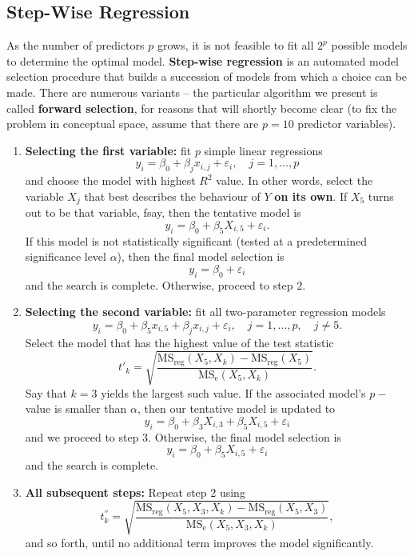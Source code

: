 \subsection{Step-Wise Regression}
As the number of predictors $p$ grows, it is not feasible to fit all $2^{p}$ possible models to determine the optimal model. \newl \textbf{Step-wise regression} is an automated model selection procedure that builds a succession of models from which a choice can be made. There are numerous variants -- the particular algorithm we present is called \textbf{forward selection}, for reasons that will shortly become clear (to fix the problem in conceptual space, assume that there are $p=10$ predictor variables).
\begin{enumerate}
    \item \textbf{Selecting the first variable:} fit $p$ simple linear regressions $$y_i=\beta_0 + \beta_jx_{i,j}+\varepsilon_i,\quad j=1,\ldots, p$$ and choose the model with highest $R^{2}$ value. In other words, select the variable $X_j$ that best describes the behaviour of $Y$ \textbf{on its own}. If $X_{5}$ turns out to be that variable, fsay, then the tentative model is $$y_{i}=\beta_{0}+\beta_{5}X_{i,5}+\varepsilon_{i}.$$ If this model is not statistically significant (tested at a predetermined significance level $\alpha$), then the final model selection is $$y_{i}=\beta_{0}+\varepsilon_{i}$$ and the search is complete. Otherwise, proceed to step 2.
    \item \textbf{Selecting the second variable:} fit all two-parameter regression models $$y_i=\beta_0 + \beta_5x_{i,5}+ \beta_jx_{i,j}+\varepsilon_i,\quad j=1,\ldots, p,\quad j\neq 5.$$ Select the model that has the highest value of the test statistic $$t{'}_{k}=\sqrt{\frac{\text{MS}_{\textrm{reg}}(X_{5},X_{k})-\text{MS}_{\textrm{reg}}(X_{5})}{\text{MS}_{\textrm{e}}(X_{5}, X_{k})}}.$$ Say that $k=3$ yields the largest such value. If the associated model's $p-$value is smaller than $\alpha$, then our tentative model is updated to $$y_{i}=\beta_{0}+\beta_{3}X_{i,3}+\beta_{5}X_{i,5}+\varepsilon_{i}$$ and we proceed to step 3. Otherwise, the final model selection is $$y_{i}=\beta_{0}+\beta_{5}X_{i,5}+\varepsilon_{i}$$ and the search is complete.  
    \item \textbf{All subsequent steps:} Repeat step 2 using $$t^{''}_k=\sqrt{\frac{\text{MS}_{\textrm{reg}}(X_{5},X_3,X_k)-\text{MS}_{\textrm{reg}}(X_{5},X_3)}{\text{MS}_{\textrm{e}}(X_{5}, X_3,X_{k})}},$$ and so forth, until no additional term improves the model significantly.
\end{enumerate}
